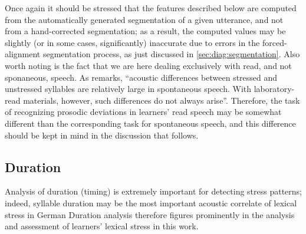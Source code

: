 Once again it should be stressed that the features described below are computed from the automatically generated segmentation of a given utterance, and not from a hand-corrected segmentation; as a result, the computed values may be slightly (or in some cases, significantly) inaccurate due to errors in the forced-alignment segmentation process, as just discussed in \cref{sec:diag:segmentation}. %
	Also worth noting is the fact that we are here dealing exclusively with read, and not sponaneous, speech. As \textcite[p.~275]{Cutler2005} remarks, ``acoustic differences between stressed and unstressed syllables are relatively large in spontaneous speech. With laboratory-read materials, however, such differences do not always arise''. Therefore, the task of recognizing prosodic deviations in learners' read speech may be somewhat different than the corresponding task for spontaneous speech, and this difference should be kept in mind in the discussion that follows.

	\subsection{Duration}
	\label{sec:prosody:duration}

	Analysis of duration (timing) is extremely important for detecting stress patterns;
indeed, syllable duration may be the most important acoustic correlate of lexical stress in German
Duration analysis therefore figures prominently in the analysis and assessment of learners' lexical stress in this work. 


